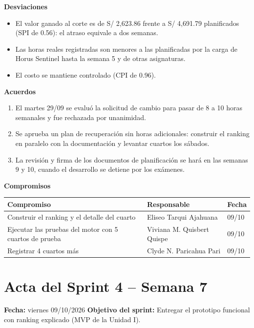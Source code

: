 \documentclass[11pt,a4paper]{article}
\begin{document}
\vspace{0.1cm}
\noindent\textbf{Desviaciones}
\begin{itemize}[leftmargin=*, itemsep=0pt]
    \item El valor ganado al corte es de S/ 2,623.86 frente a S/ 4,691.79 planificados (SPI de 0.56): el atraso equivale a dos semanas.
    \item Las horas reales registradas son menores a las planificadas por la carga de Horus Sentinel hasta la semana 5 y de otras asignaturas.
    \item El costo se mantiene controlado (CPI de 0.96).
\end{itemize}
\noindent\textbf{Acuerdos}
\begin{enumerate}[leftmargin=*, itemsep=0pt]
    \item El martes 29/09 se evaluó la solicitud de cambio para pasar de 8 a 10 horas semanales y fue rechazada por unanimidad.
    \item Se aprueba un plan de recuperación sin horas adicionales: construir el ranking en paralelo con la documentación y levantar cuartos los sábados.
    \item La revisión y firma de los documentos de planificación se hará en las semanas 9 y 10, cuando el desarrollo se detiene por los exámenes.
\end{enumerate}
\noindent\textbf{Compromisos}

\vspace{0.05cm}
{\footnotesize
{}
\noindent\begin{tabularx}{\textwidth}{@{}L P{3.6cm} C{1.6cm}@{}}
\toprule
{}
\textbf{Compromiso} & \textbf{Responsable} & \textbf{Fecha} \\
\midrule
Construir el ranking y el detalle del cuarto & Eliseo Tarqui Ajahuana & 09/10 \\
Ejecutar las pruebas del motor con 5 cuartos de prueba & Viviana M. Quisbert Quispe & 09/10 \\
Registrar 4 cuartos más & Clyde N. Paricahua Pari & 09/10 \\
\bottomrule
\end{tabularx}
}

\section{Acta del Sprint 4 -- Semana 7}
\noindent\textbf{Fecha:} viernes 09/10/2026 \quad \textbar\quad \textbf{Objetivo del sprint:} Entregar el prototipo funcional con ranking explicado (MVP de la Unidad I).
\end{document}
